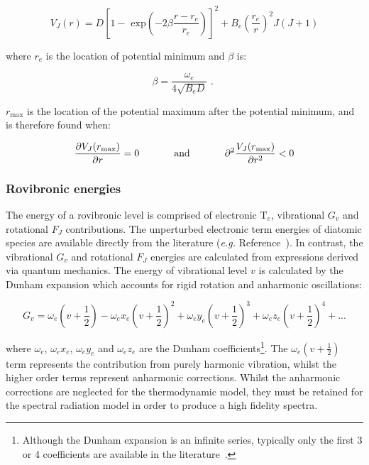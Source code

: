 \begin{equation}
 V_J ( r ) = D \left [ 1 - \text{~exp} \left ( - 2 \beta \frac{r - r_e}{r_e} \right ) \right ]^2 + B_e \left ( \frac{r_e}{r} \right )^2 J ( J + 1 )
\end{equation}

\noindent where $r_e$ is the location of potential minimum and $\beta$ is:

\begin{equation}
 \beta = \frac{\omega_e}{4 \sqrt{B_e D}} \text{ . }
\end{equation}

\noindent $r_\text{max}$ is the location of the potential maximum after the potential minimum, and is therefore found when:

\begin{equation}
 \frac{ \partial V_J ( r_\text{max} )}{\partial r} = 0 \text{ \hspace{1cm} and \hspace{1cm} }   \partial^2 \frac{V_J ( r_\text{max})}{\partial r^2} < 0
\end{equation}

\subsubsection{Rovibronic energies}

The energy of a rovibronic level is comprised of electronic $\mathrm{T}_e$, vibrational $G_v$ and rotational $F_J$ contributions.
The unperturbed electronic term energies of diatomic species are available directly from the literature (\textit{e.g.} Reference~\cite{HH_NIST}).
In contrast, the vibrational $G_v$ and rotational $F_J$ energies are calculated from expressions derived via quantum mechanics.
The energy of vibrational level $v$ is calculated by the Dunham expansion which accounts for rigid rotation and anharmonic oscillations:

\begin{equation}
 G_v = \omega_e ( v + \frac{1}{2} ) - \omega_e x_e ( v + \frac{1}{2} )^2 + \omega_e y_e ( v + \frac{1}{2} )^3 + \omega_e z_e ( v + \frac{1}{2} )^4 + ... \label{eq:G_v}
\end{equation}

\noindent where $\omega_e$,  $\omega_e x_e$, $\omega_e y_e$ and $\omega_e z_e$ are the Dunham coefficients\footnote{Although the Dunham expansion is an infinite series, typically only the first 3 or 4 coefficients are available in the literature~\cite{HH_1979}.}.
The $\omega_e ( v + \frac{1}{2} )$ term represents the contribution from purely harmonic vibration, whilst the higher order terms represent anharmonic corrections.
Whilst the anharmonic corrections are neglected for the thermodynamic model, they must be retained for the spectral radiation model in order to produce a high fidelity spectra.

